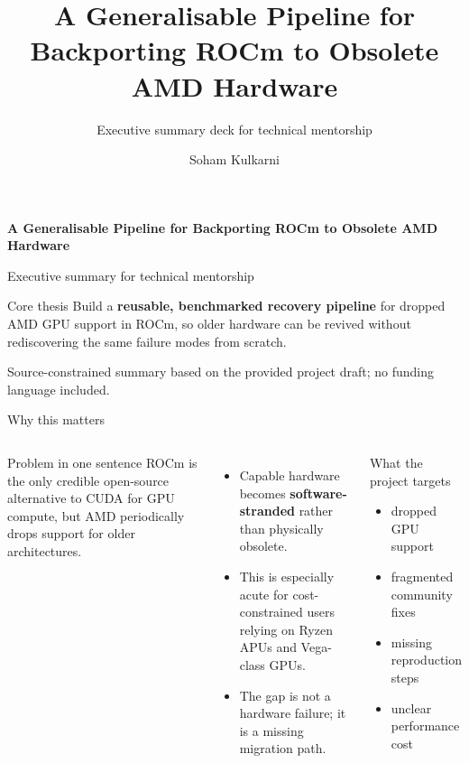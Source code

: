 \documentclass[aspectratio=169,11pt]{beamer}
\title{A Generalisable Pipeline for Backporting ROCm to Obsolete AMD Hardware}
\subtitle{Executive summary deck for technical mentorship}
\author{Soham Kulkarni}
\date{}
\newcommand{\kw}[1]{\textbf{#1}}
\newcommand{\smalltag}[1]{\textcolor{WarmGray}{\footnotesize #1}}
\begin{document}
\begin{frame}[plain]
    \vspace{0.8cm}
    {\LARGE\bfseries\color{Navy} A Generalisable Pipeline for Backporting ROCm to Obsolete AMD Hardware}\par
    \vspace{0.25cm}
    {\large\color{Slate} Executive summary for technical mentorship}\par
    \vspace{0.9cm}

    \begin{block}{Core thesis}
        \large
        Build a \kw{reusable, benchmarked recovery pipeline} for dropped AMD GPU support in ROCm, so older hardware can be revived without rediscovering the same failure modes from scratch.
    \end{block}

    \vfill
    \smalltag{Source-constrained summary based on the provided project draft; no funding language included.}
\end{frame}

\begin{frame}{Why this matters}
    \begin{columns}[T,onlytextwidth]
        \begin{block}{Problem in one sentence}
            ROCm is the only credible open-source alternative to CUDA for GPU compute, but AMD periodically drops support for older architectures.
        \end{block}

        \begin{itemize}
            \item Capable hardware becomes \kw{software-stranded} rather than physically obsolete.
            \item This is especially acute for cost-constrained users relying on Ryzen APUs and Vega-class GPUs.
            \item The gap is not a hardware failure; it is a missing migration path.
        \end{itemize}

        \begin{block}{What the project targets}
            \begin{itemize}
                \item dropped GPU support
                \item fragmented community fixes
                \item missing reproduction steps
                \item unclear performance cost
            \end{itemize}
        \end{block}
    \end{columns}
\end{frame}
\end{document}
